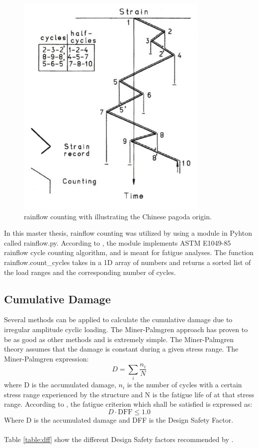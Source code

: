 \begin{figure}[H]
\centering
\includegraphics[scale=0.9]{figures/pagoda}
\caption[$\; \:$rainflow counting]{rainflow counting with illustrating the Chinese pagoda origin.    \cite{fatigue2016} }
 \label{fig:pagoda}
\end{figure}
\noindent In this master thesis, rainflow counting was utilized by using a module in Pyhton called rainflow.py. According to \cite{rf}, the module implements ASTM E1049-85 rainflow cycle counting
algorithm, and is meant for fatigue analyses. The function rainflow.count\_cycles takes in a 1D array of numbers and returns a sorted list of the load ranges and the corresponding
number of cycles.

\subsection{Cumulative Damage}
Several methods can be applied to calculate the cumulative damage due to irregular amplitude cyclic loading. The Miner-Palmgren approach has proven to be as good as other methods and is extremely simple. The Miner-Palmgren theory assumes that the damage is constant during a given stress range. The Miner-Palmgren expression:
\begin{equation}
    D=\sum_i \frac{n_i}{N} 
    \label{eq:MP}
\end{equation}
where D is the accumulated damage, $n_i$ is the number of cycles with a certain stress range experienced by the structure and N is the fatigue life of at that stress range.\newline
\newline
According to \cite{riserfat}, the fatigue criterion which shall be satisfied is expressed as:
\begin{equation}
    D \cdot \text{DFF} \leq 1.0
\end{equation}
Where D is the accumulated damage and DFF is the Design Safety Factor.\\\\ Table \ref{table:dff} show the different Design Safety factors recommended by \cite{riserfat}. 

